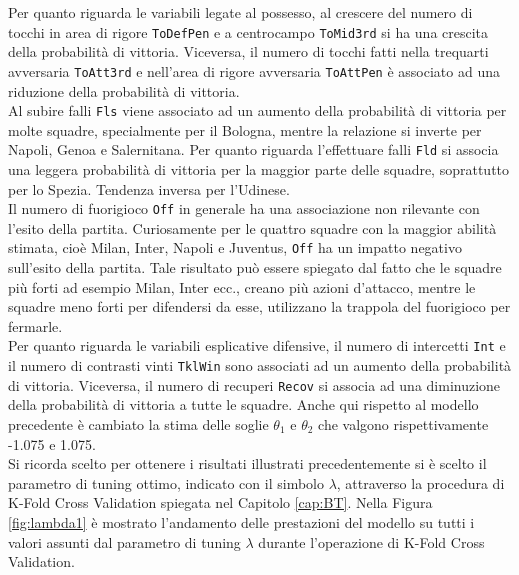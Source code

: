 Per quanto riguarda le variabili legate al possesso, al crescere del numero di tocchi in area di rigore \texttt{ToDefPen} e a centrocampo \texttt{ToMid3rd} si ha una crescita della probabilità di vittoria. Viceversa, il numero di tocchi fatti nella trequarti avversaria \texttt{ToAtt3rd} e nell'area di rigore avversaria \texttt{ToAttPen} è associato ad una riduzione della probabilità di vittoria.\\
Al subire falli \texttt{Fls} viene associato ad un aumento della probabilità di vittoria per molte squadre, specialmente per il Bologna, mentre la relazione si inverte per Napoli, Genoa e Salernitana. Per quanto riguarda l'effettuare falli \texttt{Fld} si associa una leggera probabilità di vittoria per la maggior parte delle squadre, soprattutto per lo Spezia. Tendenza inversa per l'Udinese.\\
Il numero di fuorigioco \texttt{Off} in generale ha una associazione non rilevante con l'esito della partita. Curiosamente per le quattro squadre con la maggior abilità stimata, cioè Milan, Inter, Napoli e Juventus, \texttt{Off} ha un impatto negativo sull'esito della partita. Tale risultato può essere spiegato dal fatto che le squadre più forti ad esempio Milan, Inter ecc., creano più azioni d'attacco, mentre le squadre meno forti per difendersi da esse, utilizzano la trappola del fuorigioco per fermarle.\\
Per quanto riguarda le variabili esplicative difensive, il numero di intercetti \texttt{Int} e il numero di contrasti vinti \texttt{TklWin} sono associati ad un aumento della probabilità di vittoria. Viceversa, il numero di recuperi \texttt{Recov} si associa ad una diminuzione della probabilità di vittoria a tutte le squadre. Anche qui rispetto al modello precedente è cambiato la stima delle soglie $\theta_1$ e $\theta_2$ che valgono rispettivamente -1.075 e 1.075.\\
Si ricorda scelto per ottenere i risultati illustrati precedentemente si è scelto il parametro di tuning ottimo, indicato con il simbolo $\lambda$, attraverso la procedura di K-Fold Cross Validation spiegata nel Capitolo \ref{cap:BT}. Nella Figura \ref{fig:lambda1} è mostrato l'andamento delle prestazioni del modello su tutti i valori assunti dal parametro di tuning $\lambda$ durante l'operazione di K-Fold Cross Validation.

